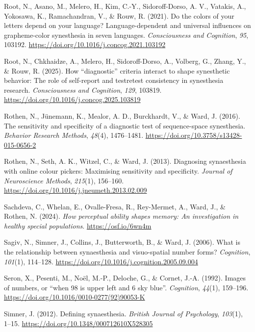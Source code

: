 \documentclass[
  man,
  floatsintext,
  longtable,
  a4paper,
  nolmodern,
  notxfonts,
  notimes,
  colorlinks=true,linkcolor=blue,citecolor=blue,urlcolor=blue]{apa7}
\newlength{\cslhangindent}
\newenvironment{CSLReferences}[2] %
 {\begin{list}{}{%
  \setlength{\itemindent}{0pt}
  \setlength{\leftmargin}{0pt}
  \setlength{\parsep}{0pt}
  \ifodd #1
   \setlength{\leftmargin}{\cslhangindent}
   \setlength{\itemindent}{-1\cslhangindent}
  \fi
  \setlength{\itemsep}{#2\baselineskip}}}
 {\end{list}}
\begin{document}
\begin{CSLReferences}{1}{0}
Root, N., Asano, M., Melero, H., Kim, C.-Y., Sidoroff-Dorso, A. V.,
Vatakis, A., Yokosawa, K., Ramachandran, V., \& Rouw, R. (2021). Do the
colors of your letters depend on your language? Language-dependent and
universal influences on grapheme-color synesthesia in seven languages.
\emph{Consciousness and Cognition}, \emph{95}, 103192.
\url{https://doi.org/10.1016/j.concog.2021.103192}

Root, N., Chkhaidze, A., Melero, H., Sidoroff-Dorso, A., Volberg, G.,
Zhang, Y., \& Rouw, R. (2025). How {``}diagnostic{''} criteria interact
to shape synesthetic behavior: The role of self-report and
test{\textendash}retest consistency in synesthesia research.
\emph{Consciousness and Cognition}, \emph{129}, 103819.
\url{https://doi.org/10.1016/j.concog.2025.103819}

Rothen, N., Jünemann, K., Mealor, A. D., Burckhardt, V., \& Ward, J.
(2016). The sensitivity and specificity of a diagnostic test of
sequence-space synesthesia. \emph{Behavior Research Methods},
\emph{48}(4), 1476--1481.
\url{https://doi.org/10.3758/s13428-015-0656-2}

Rothen, N., Seth, A. K., Witzel, C., \& Ward, J. (2013). Diagnosing
synaesthesia with online colour pickers: Maximising sensitivity and
specificity. \emph{Journal of Neuroscience Methods}, \emph{215}(1),
156--160. \url{https://doi.org/10.1016/j.jneumeth.2013.02.009}

Sachdeva, C., Whelan, E., Ovalle-Fresa, R., Rey-Mermet, A., Ward, J., \&
Rothen, N. (2024). \emph{How perceptual ability shapes memory: An
investigation in healthy special populations}.
\url{https://osf.io/6wn4m}

Sagiv, N., Simner, J., Collins, J., Butterworth, B., \& Ward, J. (2006).
What is the relationship between synaesthesia and visuo-spatial number
forms? \emph{Cognition}, \emph{101}(1), 114--128.
\url{https://doi.org/10.1016/j.cognition.2005.09.004}

Seron, X., Pesenti, M., Noël, M.-P., Deloche, G., \& Cornet, J.-A.
(1992). Images of numbers, or {``}when 98 is upper left and 6 sky
blue{''}. \emph{Cognition}, \emph{44}(1), 159--196.
\url{https://doi.org/10.1016/0010-0277(92)90053-K}

Simner, J. (2012). Defining synaesthesia. \emph{British Journal of
Psychology}, \emph{103}(1), 1--15.
\url{https://doi.org/10.1348/000712610X528305}


\end{CSLReferences}
\end{document}
